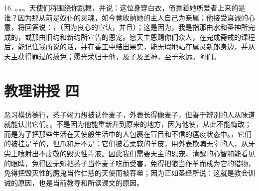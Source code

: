 16. 。。。天使们将围绕你跳舞，并说：这位身穿白衣，倚靠着她所爱者上来的是谁？因为那从前是奴仆的灵魂，如今竟收纳她的主人自己为亲属；他接受真诚的心意，将回答说：，（因为良心的宣认，并且）；这是因为，我是指那由水和圣神所完成的，或那由旧约和新约所宣告的恩宠。愿天主恩赐你们众人，在完成斋戒的课程后，能记住我所说的话，并在善工中结出果实，能无瑕地站在属灵新郎身边，并从天主获得罪过的赦免；愿光荣归于他，及子及圣神，至于永远。阿们。\par



\section{教理讲授 四}

\par

\par

\par

恶习模仿德行，莠子竭力想被认作麦子，外表长得像麦子，但善于辨别的人从味道就能认出它们。，不是因为他能重新升到原来的地方，因为他使，从此不能悔改；而是为了把那些生活在天使般生活中的人包裹在盲目和不信的瘟疫状态中。，它们的披挂是羊的，但爪和牙不是：它们披着柔软的羊皮，用外表欺骗无辜的人，从牙尖上喷射出不虔敬的毁灭性毒液。因此我们需要天主的恩宠、清醒的心智和能看见的眼睛，免得因无知把莠子当作麦子吃而受害，免得把狼当作羊而成为它的猎物，免得把毁灭性的魔鬼当作仁慈的天使而被吞噬；因为正如圣经所说：这就是教会训诫的原因，也是当前教导和所读课文的原因。\par

